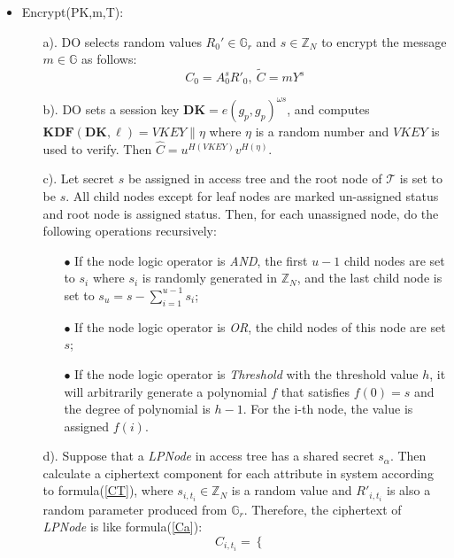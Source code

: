 \documentclass[smallextended]{svjour3}       %
\begin{document}
\begin{itemize}
	\item Encrypt(PK,m,T): 
		\begin{itemize}
			\item [a).]	DO selects random values $R_0' \in \mathbb{G}_r$ and $s \in \mathbb{Z}_N$ to encrypt the message $m \in \mathbb{G}$ as follows:
						\begin{equation}
							C_0 = A_0^sR'_0, \ \tilde{C} = mY^s
						\end{equation}

			\item [b).] DO sets a session key $\textbf{DK}=e(g_p,g_p)^{\omega s}$, and computes $\textbf{KDF}(\textbf{DK}, \ell) = VKEY \parallel \eta $ where $\eta$ is a random number and $VKEY$ is used to verify.
						Then $\widehat{C}=u^{H(VKEY)}v^{H(\eta)}$.
						
			\item [c).] Let secret $s$ be assigned in access tree and the root node of $\mathcal{T}$ is set to be $s$. 
						All child nodes except for leaf nodes are marked un-assigned status and root node is assigned status.
						Then, for each unassigned node, do the following operations recursively:
						\begin{itemize}
							\item [$\bullet$] If the node logic operator is \textit{AND}, the first $u-1$ child nodes are set to $s_i$ where $s_i$ is randomly generated in $\mathbb{Z}_N$, and the last child node is set to $s_u=s-\sum_{i=1}^{u-1}s_i$;
							\item [$\bullet$] If the node logic operator is \textit{OR},  the child nodes of this node are set $s$;	
							\item [$\bullet$] If the node logic operator is \textit{Threshold} with the threshold value $h$, it will arbitrarily generate a polynomial $f$ that satisfies $f(0)=s$ and the degree of polynomial is $h-1$. For the i-th node, the value is assigned $f(i)$. 
						\end{itemize}
			\item [d).] Suppose that a \textit{LPNode} in access tree has a shared secret $s_\alpha$. 
						Then calculate a ciphertext component for each attribute in system according to formula(\ref{CT}), where $s_{i,t_i} \in \mathbb{Z}_N$ is a random value and $R'_{i,t_i}$ is also a random parameter produced from $\mathbb{G}_r$. 
						Therefore, the ciphertext of \textit{LPNode} is like formula(\ref{Ca}):
			\begin{equation}\label{CT}
				C_{i,t_i}=
				\begin{cases}

\end{cases}
\end{equation}
\end{itemize}
\end{itemize}
\end{document}
